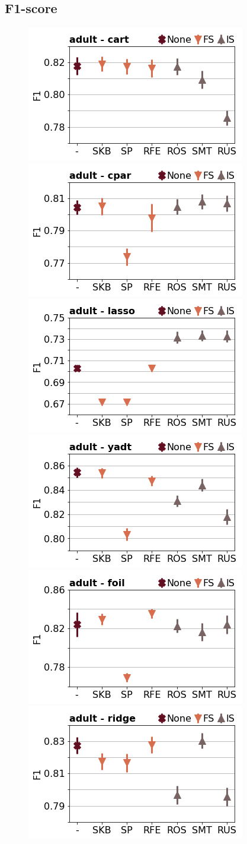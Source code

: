 \documentclass[runningheads,a4paper]{llncs}
\begin{document}
\clearpage

\subsection{F1-score}

\begin{figure}[!h]
\includegraphics[width=0.32\linewidth]{fig/preps_adult_DT_sklearn_f1score.png}
\includegraphics[width=0.32\linewidth]{fig/preps_adult_RB_cpar_f1score.png}
\includegraphics[width=0.32\linewidth]{fig/preps_adult_LM_lasso_f1score.png}
\includegraphics[width=0.32\linewidth]{fig/preps_adult_DT_yadt_f1score.png}
\includegraphics[width=0.32\linewidth]{fig/preps_adult_RB_foil_f1score.png}
\includegraphics[width=0.32\linewidth]{fig/preps_adult_LM_ridge_f1score.png}
\end{figure}
\end{document}
